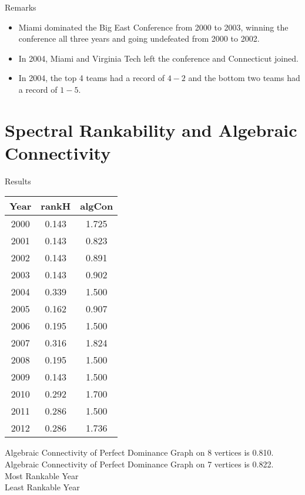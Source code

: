 \documentclass{beamer}
\begin{document}
\begin{frame}{Remarks}
\vfill
\begin{itemize}
\item Miami dominated the Big East Conference from 2000 to 2003, winning the conference all three years and going undefeated from 2000 to 2002.
\vfill
\item	In 2004, Miami and Virginia Tech left the conference and Connecticut joined.
\vfill
\item	In 2004, the top 4 teams had a record of $4-2$ and the bottom two teams had a record of $1-5$.
\end{itemize}
\vfill
\end{frame}

\section{Spectral Rankability and Algebraic Connectivity}

\begin{frame}{Results}
\begin{minipage}{0.6\textwidth}
\centering
\begin{tabular}{|| c | c | c ||}
\hline
Year & rankH & algCon \\
\hline\hline
2000 & 0.143 & 1.725 \\
\hline
\rowcolor{secondary}
2001 & 0.143 & 0.823 \\
\hline
2002 & 0.143 & 0.891 \\
\hline
2003 & 0.143 & 0.902 \\
\hline
2004 & 0.339 & 1.500 \\
\hline
2005 & 0.162 & 0.907 \\
\hline
2006 & 0.195 & 1.500 \\
\hline
\rowcolor{text}
2007 & 0.316 & 1.824 \\
\hline
2008 & 0.195 & 1.500 \\
\hline
2009 & 0.143 & 1.500 \\
\hline
2010 & 0.292 & 1.700 \\
\hline
2011 & 0.286 & 1.500 \\
\hline
2012 & 0.286 & 1.736 \\
\hline
\end{tabular}
\end{minipage}\hfill
\begin{minipage}{0.4\textwidth}
Algebraic Connectivity of Perfect Dominance Graph on 8 vertices is 0.810. \\
\vfill
Algebraic Connectivity of Perfect Dominance Graph on 7 vertices is 0.822. \\
\vfill
{}\quad Most Rankable Year \\
\vfill
{}\quad Least Rankable Year \\
\vfill
\end{minipage}
\end{frame}
\end{document}
